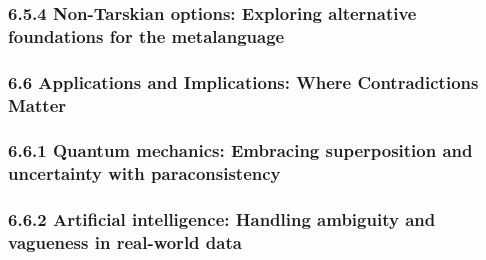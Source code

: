 \hypertarget{non-tarskian-options-exploring-alternative-foundations-for-the-metalanguage}{%
\subsubsection*{6.5.4 Non-Tarskian options: Exploring alternative
foundations for the
metalanguage}\label{non-tarskian-options-exploring-alternative-foundations-for-the-metalanguage}}

\hypertarget{applications-and-implications-where-contradictions-matter}{%
\subsubsection*{\texorpdfstring{\textbf{6.6 Applications and
Implications: Where Contradictions Matter}
}{6.6 Applications and Implications: Where Contradictions Matter }}\label{applications-and-implications-where-contradictions-matter}}

\hypertarget{quantum-mechanics-embracing-superposition-and-uncertainty-with-paraconsistency}{%
\subsubsection*{\texorpdfstring{6.6.1 Quantum mechanics: Embracing
superposition and uncertainty with paraconsistency
}{6.6.1 Quantum mechanics: Embracing superposition and uncertainty with paraconsistency }}\label{quantum-mechanics-embracing-superposition-and-uncertainty-with-paraconsistency}}

\hypertarget{artificial-intelligence-handling-ambiguity-and-vagueness-in-real-world-data}{%
\subsubsection*{\texorpdfstring{6.6.2 Artificial intelligence: Handling
ambiguity and vagueness in real-world data
}{6.6.2 Artificial intelligence: Handling ambiguity and vagueness in real-world data }}\label{artificial-intelligence-handling-ambiguity-and-vagueness-in-real-world-data}}

